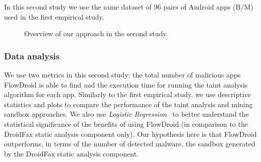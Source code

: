 In this second study we use the same dataset of $96$ pairs of Android apps (B/M) used in the first empirical
study.


\begin{figure}
  \caption{Overview of our approach in the second study.}
  \label{fig:settings2}
\end{figure}


\subsubsection{Data analysis}


We use two metrics in this second study:
the total number of malicious apps FlowDroid is able to
find and the execution time for running the taint analysis algorithm
for each app. Similarly to the first empirical study,
we use descriptive statistics
and plots to compare the performance of the taint analysis and
mining sandbox approaches. We also use \emph{Logistic Regression}~\cite[Chapter~4]{statistical-learning}
to better understand the statistical
significance of the benefits of using FlowDroid
(in comparison to the DroidFax static analysis
component only). Our hypothesis here is that
FlowDroid outperforms, in terms of the number of
detected malware, the sandbox generated
by the DroidFax static analysis component. 
